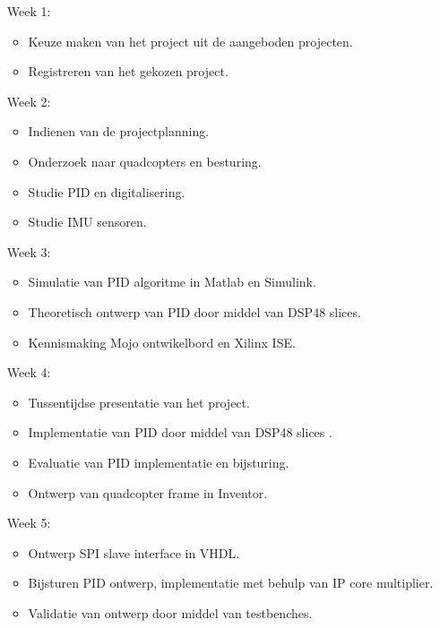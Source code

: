 			\begin{itemize}
				
				\item[Week 1:] 
					\begin{itemize}
						\item Keuze maken van het project uit de aangeboden projecten.  
						\item Registreren van het gekozen project.
					\end{itemize}

				\item[Week 2:] 
					\begin{itemize}
						\item Indienen van de projectplanning.
						\item Onderzoek naar quadcopters en besturing.
						\item Studie PID en digitalisering.
						\item Studie IMU sensoren.
					\end{itemize}

				\item[Week 3:]
					\begin{itemize}
						\item Simulatie van PID algoritme in Matlab en Simulink.
						\item Theoretisch ontwerp van PID door middel van DSP48 slices.
						\item Kennismaking Mojo ontwikelbord en Xilinx ISE.
					\end{itemize}				

				\item[Week 4:]
					\begin{itemize}
						\item Tussentijdse presentatie van het project.
						\item Implementatie van PID door middel van DSP48 slices .
						\item Evaluatie van PID implementatie en bijsturing.
						\item Ontwerp van quadcopter frame in Inventor.
					\end{itemize}					

				\item[Week 5:]
					\begin{itemize}
						\item Ontwerp SPI slave interface in VHDL.
						\item Bijsturen PID ontwerp, implementatie met behulp van IP core multiplier.
						\item Validatie van ontwerp door middel van testbenches.


\end{itemize}
\end{itemize}
